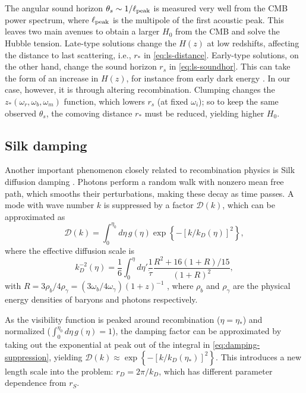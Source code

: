 The angular sound horizon $\theta_s \sim 1/\ell_{\rm peak}$ is measured very well from the CMB power spectrum, where
$\ell_{\rm peak}$ is the multipole of the first acoustic peak.
This leaves two main avenues to obtain a larger $H_0$ from the CMB and solve the Hubble tension.
Late-type solutions change the $H(z)$ at low redshifts, affecting the distance to last scattering, i.e., $r_*$ in \cref{eq:ls-distance}.
Early-type solutions, on the other hand, change the sound horizon $r_s$ in \cref{eq:ls-soundhor}.
This can take the form of an increase in $H(z)$, for instance from early dark energy \citep{early-sol19ede,early-sol20edenu,early-sol19rock}.
In our case, however, it is through altering recombination.
Clumping changes the $z_*\left( \omega_r,\omega_b,\omega_m \right)$ function, which lowers $r_s$ (at fixed $\omega_i$); so to keep the same observed $\theta_s$, the comoving distance $r_*$ must be reduced, yielding higher $H_0$.

\subsection{Silk damping}

Another important phenomenon closely related to recombination physics is Silk diffusion damping \citep{silk-damping}. 
Photons perform a random walk with nonzero mean free path, which smooths their perturbations, making these decay as time passes.
A mode with wave number $k$ is suppressed by a factor $\mathcal{D}\left( k \right)$, which can be approximated as
\begin{equation}
\mathcal{D}\left( k \right) = \int_0^{\eta_0} d\eta \, g(\eta) \exp\left\{ -\left[ k/k_D \left( \eta \right) \right]^2 \right\}, \label{eq:damping-suppression} 
\end{equation}
where the effective diffusion scale is
\begin{equation}
k_D^{-2}\left( \eta \right) = \frac16 \int_0^{\eta} d\eta' \frac1{\dot\tau} \frac{R^2+16\left( 1+R \right)/15}{\left( 1+R \right)^2}, \label{eq:damping-scale}
\end{equation}
with $R=3\rho_b/4\rho_\gamma=\left(3\omega_b/4\omega_\gamma\right)\left(1+z\right)^{-1}$ \citep{cmb-damping-tail}, where $\rho_b$ and $\rho_\gamma$ are the physical energy densities of baryons and photons respectively.

As the visibility function is peaked around recombination ($\eta=\eta_*$) and normalized ($\int_0^{\eta_0}d\eta\, g\left(\eta\right)=1$), the damping factor can be approximated by taking out the exponential at peak out of the integral in \cref{eq:damping-suppression}, yielding $\mathcal{D}\left( k \right) \approx \exp\left\{ -\left[ k/k_D \left( \eta_* \right) \right]^2 \right\}$.
This introduces a new length scale into the problem: $r_D=2\pi/k_D$, which has different parameter dependence from $r_S$.

